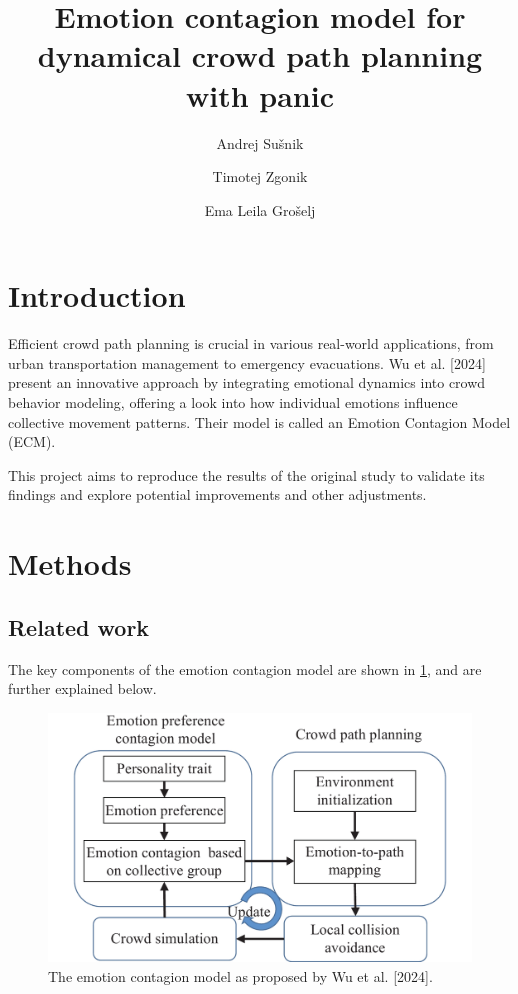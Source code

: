 \documentclass[9pt]{pnas-new}
\title{Emotion contagion model for dynamical crowd path planning with panic}
\author{Andrej Sušnik}
\author{Timotej Zgonik}
\author{Ema Leila Grošelj}
\affil{Collective behaviour course research seminar report}
\begin{document}
\verticaladjustment{-2pt}

\maketitle
\thispagestyle{firststyle}


\section{Introduction}
Efficient crowd path planning is crucial in various real-world applications, from urban transportation management to emergency evacuations. Wu et al. [2024] present an innovative approach by integrating emotional dynamics into crowd behavior modeling, offering a look into how individual emotions influence collective movement patterns. Their model is called an Emotion Contagion Model (ECM).

This project aims to reproduce the results of the original study to validate its findings and explore potential improvements and other adjustments.

\section{Methods}
\subsection{Related work} 

The key components of the emotion contagion model are shown in \ref{fig:outline}, and are further explained below. 
\begin{figure}[h!]
    \centering
    \includegraphics[width=0.6\linewidth]{fig/outline.jpg}
    \caption{The emotion contagion model as proposed by Wu et al. [2024].}
    \label{fig:outline}
\end{figure}
\end{document}
